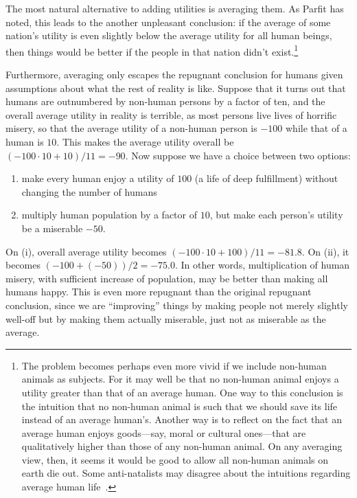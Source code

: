 The most natural alternative to adding utilities is averaging them. As Parfit has noted, this leads to the another
unpleasant conclusion: if the average of some nation's utility is even slightly below the average utility for all
human beings, then things would be better if the people in that nation didn't exist.\footnote{The problem becomes
perhaps even more vivid if we include non-human animals as subjects. For it may well be that no non-human animal
enjoys a utility greater than that of an average human. One way to this conclusion is the intuition that no 
non-human animal is such that we should save its life instead of an average human's. Another way is to reflect on
the fact that an average human enjoys goods---say, moral or cultural ones---that are qualitatively higher than those
of any non-human animal. On any averaging view, then, it seems it would be good to allow all non-human animals on 
earth die out. Some anti-natalists may disagree about the intuitions regarding average human life~\parencite{Benatar1997}.} 

Furthermore, averaging only escapes the repugnant conclusion for humans given assumptions about what the rest of reality 
is like. Suppose that it turns out that humans are outnumbered by non-human persons by a factor of ten, and the overall average
utility in reality is terrible, as most persons live lives of horrific misery, so that the average utility of a non-human 
person is $-100$ while that of a human is $10$. This makes the average utility overall be $(-100\cdot 10 + 10)/11 = -90$.
Now suppose we have a choice between two options:
\begin{enumerate}
\item[(i)] make every human enjoy a utility of $100$ (a life of deep fulfillment) without changing the number of humans
\item[(ii)]  multiply human population by a factor of $10$, but make each person's utility be a miserable $-50$. 
\end{enumerate}
On (i), overall average utility
becomes $(-100\cdot 10 + 100)/11 = -81.8$. On (ii), it becomes $(-100+(-50))/2 = -75.0$. In other words, multiplication 
of human misery, with sufficient increase of population, may be better than making all humans happy. This is even more repugnant than the original repugnant conclusion, since we are 
``improving'' things by making people not merely slightly well-off but by making them actually miserable, just not as miserable
as the average.

